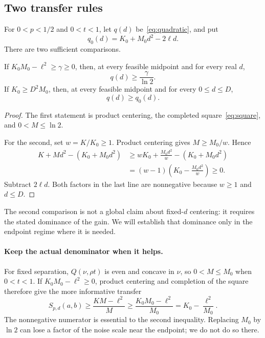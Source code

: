 \subsection{Two transfer rules}
\begin{lemma}\label{lem:transfer}
For $0<p<1/2$ and $0<t<1$, let $q(d)$ be~\eqref{eq:quadratic}, and put
\begin{equation}\label{eq:q0}
q_0(d)=K_0+M_0d^2-2\ell d.
\end{equation}
There are two sufficient comparisons.

If $K_0M_0-\ell^2\ge\gamma\ge0$, then, at every feasible midpoint and for every real $d$,
\begin{equation}\label{eq:transferproduct}
q(d)\ge\frac{\gamma}{\ln2}.
\end{equation}
If $K_0\ge D^2M_0$, then, at every feasible midpoint and for every $0\le d\le D$,
\begin{equation}\label{eq:transfergain}
q(d)\ge q_0(d).
\end{equation}
\end{lemma}
\begin{proof}
The first statement is product centering, the completed square~\eqref{eq:square}, and $0<M\le\ln2$.

For the second, set $w=K/K_0\ge1$. Product centering gives $M\ge M_0/w$. Hence
\begin{align*}
K+Md^2-(K_0+M_0d^2)
&\ge wK_0+\frac{M_0d^2}{w}-(K_0+M_0d^2)\\
&=(w-1)\left(K_0-\frac{M_0d^2}{w}\right)\ge0.
\end{align*}
Subtract $2\ell d$. Both factors in the last line are nonnegative because $w\ge1$ and $d\le D$.
\end{proof}

The second comparison is not a global claim about fixed-$d$ centering: it requires the stated dominance of the gain. We will establish that dominance only in the endpoint regime where it is needed.


\paragraph{Keep the actual denominator when it helps.}
For fixed separation, $Q(\nu,\rho t)$ is even and concave in $\nu$, so $0<M\le M_0$ when $0<t<1$. If $K_0M_0-\ell^2\ge0$, product centering and completion of the square therefore give the more informative transfer
\begin{equation}\label{eq:relative-transfer}
S_{p,d}(a,b)
\ge\frac{KM-\ell^2}{M}
\ge\frac{K_0M_0-\ell^2}{M_0}
=K_0-\frac{\ell^2}{M_0}.
\end{equation}
The nonnegative numerator is essential to the second inequality. Replacing $M_0$ by $\ln2$ can lose a factor of the noise scale near the endpoint; we do not do so there.


